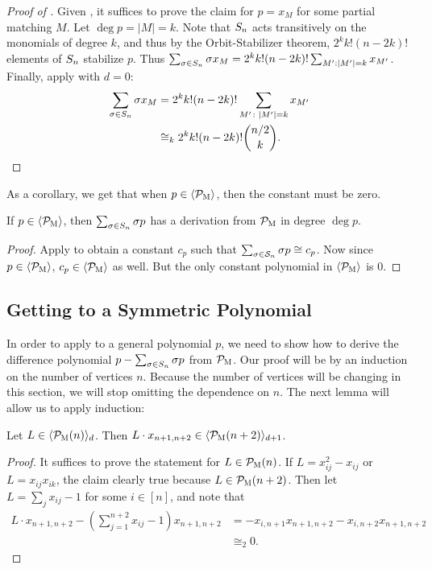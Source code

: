 \begin{proof}[Proof of ]
Given ,
it suffices to prove the claim for
\(p = x_{M}\) for some partial matching \(M\).
Let $\deg p = |M| = k$.
Note that $S_{n}$ acts transitively on the monomials of degree $k$, and thus by the Orbit-Stabilizer theorem, $2^k k! (n-2k)!$ elements of $S_{n}$ stabilize $p$.
Thus $\sum_{\sigma \in S_{n}} \sigma x_M = 2^k k! (n-2k)!\sum_{M': |M'| = k} x_{M'}$.
Finally, apply  with $d = 0$:
\begin{equation*}
  \begin{split}
  \sum_{\sigma \in S_{n}} \sigma x_{M}
  &= 2^{k} k! (n-2k)! \sum_{M' \colon \left|M'\right| = k} x_{M'} \\
  &\cong_k
  2^{k} k! (n-2k)! \binom{n/2}{k}.
  \end{split}
\end{equation*}
\end{proof}
As a corollary, we get that when $p \in \langle \mathcal P_{\textsc{M}} \rangle$, then the constant must be zero.
\begin{corollary}\label{cor:constantiszero}
If $p \in \langle \mathcal P_{\textsc{M}} \rangle$, then $\sum_{\sigma \in S_{n}} \sigma p$ has a derivation from $\mathcal P_{\textsc{M}}$ in degree $\deg p$.
\end{corollary}
\begin{proof}
Apply  to obtain a constant $c_p$ such that $\sum_{\sigma \in \mathcal S_n} \sigma p \cong c_p$. 
Now since $p \in \langle \mathcal P_{\textsc{M}} \rangle$, $c_p \in \langle \mathcal P_{\textsc{M}} \rangle$ as well. But the only constant polynomial in $\langle \mathcal P_{\textsc{M}} \rangle$ is $0$.
\end{proof}

\subsection{Getting to a Symmetric Polynomial}
In order to apply  to a general polynomial $p$, we need to show how to derive the difference polynomial $p - \sum_{\sigma \in S_{n}} \sigma p$ from $\mathcal P_{\textsc{M}}$. Our proof will be by an induction on the number of vertices $n$. Because the number of vertices will be changing in this section, we will stop omitting the dependence on $n$.
The next lemma will allow us to apply induction:
\begin{lemma}
  \label{lem:degree-increase}
  Let \(L \in \langle \mathcal P_{\textsc{M}}(n) \rangle_d\).
	Then $L \cdot x_{n+1,n+2} \in \langle \mathcal P_{\textsc{M}}(n+2) \rangle_{d+1}$.
\end{lemma}
\begin{proof}
It suffices to prove the statement for $L \in \mathcal P_{\textsc{M}}(n)$. 
If $L = x_{ij}^2 - x_{ij}$ or $L = x_{ij}x_{ik}$, the claim clearly true because $L \in \mathcal P_{\textsc{M}}(n+2)$.
Then let $L = \sum_j x_{ij} - 1$ for some $i \in [n]$, and note that 
\begin{align*}
L\cdot x_{n+1,n+2} - \left(\sum_{j=1}^{n+2} x_{ij} - 1\right)x_{n+1,n+2} &= -x_{i,n+1}x_{n+1,n+2} - x_{i,n+2}x_{n+1,n+2} \\
&\cong_2 0.
\end{align*}
\end{proof}

